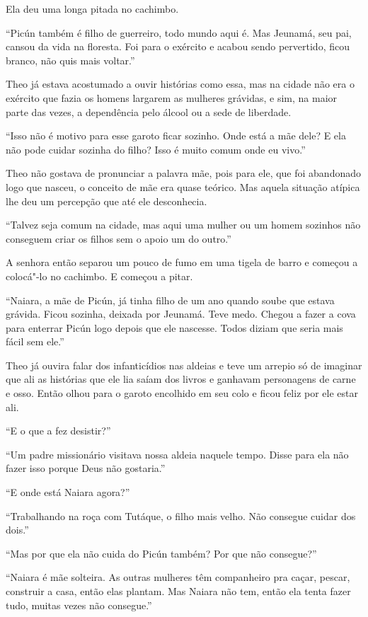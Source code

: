 Ela deu uma longa pitada no cachimbo.

``Picún também é filho de guerreiro, todo mundo aqui é. Mas Jeunamá, seu
pai, cansou da vida na floresta. Foi para o exército e acabou sendo
pervertido, ficou branco, não quis mais voltar.''

Theo já estava acostumado a ouvir histórias como essa, mas na cidade não
era o exército que fazia os homens largarem as mulheres grávidas, e sim,
na maior parte das vezes, a dependência pelo álcool ou a sede de
liberdade.

``Isso não é motivo para esse garoto ficar sozinho. Onde está a mãe
dele? E ela não pode cuidar sozinha do filho? Isso é muito comum onde eu
vivo.''

Theo não gostava de pronunciar a palavra mãe, pois para ele, que foi
abandonado logo que nasceu, o conceito de mãe era quase teórico. Mas aquela
situação atípica lhe deu um percepção que até ele desconhecia.

``Talvez seja comum na cidade, mas aqui uma mulher ou um homem sozinhos
não conseguem criar os filhos sem o apoio um do outro.''

A senhora então separou um pouco de fumo em uma tigela de barro e
começou a colocá"-lo no cachimbo. E começou a pitar.

``Naiara, a mãe de Picún, já tinha filho de um ano quando soube que
estava grávida. Ficou sozinha, deixada por Jeunamá. Teve medo. Chegou a
fazer a cova para enterrar Picún logo depois que ele nascesse. Todos
diziam que seria mais fácil sem ele.''

Theo já ouvira falar dos infanticídios nas aldeias e teve um arrepio só
de imaginar que ali as histórias que ele lia saíam dos livros e ganhavam
personagens de carne e osso. Então olhou para o garoto encolhido em seu
colo e ficou feliz por ele estar ali.

``E o que a fez desistir?''

``Um padre missionário visitava nossa aldeia naquele tempo. Disse para
ela não fazer isso porque Deus não gostaria.''

``E onde está Naiara agora?''

``Trabalhando na roça com Tutáque, o filho mais velho. Não consegue
cuidar dos dois.''

``Mas por que ela não cuida do Picún também? Por que não consegue?''

``Naiara é mãe solteira. As outras mulheres têm companheiro pra caçar,
pescar, construir a casa, então elas plantam. Mas Naiara não tem, então
ela tenta fazer tudo, muitas vezes não consegue.''

